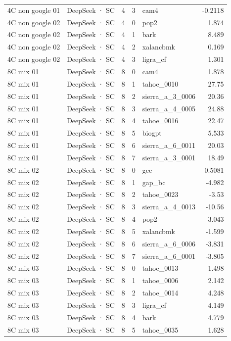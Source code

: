 \begin{tabular}{llrrlr}
4C non google 01 & DeepSeek · SC & 4 & 3 & cam4 & -0.2118 \\
4C non google 02 & DeepSeek · SC & 4 & 0 & pop2 & 1.874 \\
4C non google 02 & DeepSeek · SC & 4 & 1 & bark & 8.489 \\
4C non google 02 & DeepSeek · SC & 4 & 2 & xalancbmk & 0.169 \\
4C non google 02 & DeepSeek · SC & 4 & 3 & ligra\_cf & 1.301 \\
8C mix 01 & DeepSeek · SC & 8 & 0 & cam4 & 1.878 \\
8C mix 01 & DeepSeek · SC & 8 & 1 & tahoe\_0010 & 27.75 \\
8C mix 01 & DeepSeek · SC & 8 & 2 & sierra\_a\_3\_0006 & 20.36 \\
8C mix 01 & DeepSeek · SC & 8 & 3 & sierra\_a\_4\_0005 & 24.88 \\
8C mix 01 & DeepSeek · SC & 8 & 4 & tahoe\_0016 & 22.47 \\
8C mix 01 & DeepSeek · SC & 8 & 5 & biogpt & 5.533 \\
8C mix 01 & DeepSeek · SC & 8 & 6 & sierra\_a\_6\_0011 & 20.03 \\
8C mix 01 & DeepSeek · SC & 8 & 7 & sierra\_a\_3\_0001 & 18.49 \\
8C mix 02 & DeepSeek · SC & 8 & 0 & gcc & 0.5081 \\
8C mix 02 & DeepSeek · SC & 8 & 1 & gap\_bc & -4.982 \\
8C mix 02 & DeepSeek · SC & 8 & 2 & tahoe\_0023 & -3.53 \\
8C mix 02 & DeepSeek · SC & 8 & 3 & sierra\_a\_4\_0013 & -10.56 \\
8C mix 02 & DeepSeek · SC & 8 & 4 & pop2 & 3.043 \\
8C mix 02 & DeepSeek · SC & 8 & 5 & xalancbmk & -1.599 \\
8C mix 02 & DeepSeek · SC & 8 & 6 & sierra\_a\_6\_0006 & -3.831 \\
8C mix 02 & DeepSeek · SC & 8 & 7 & sierra\_a\_6\_0001 & -3.805 \\
8C mix 03 & DeepSeek · SC & 8 & 0 & tahoe\_0013 & 1.498 \\
8C mix 03 & DeepSeek · SC & 8 & 1 & tahoe\_0006 & 2.142 \\
8C mix 03 & DeepSeek · SC & 8 & 2 & tahoe\_0014 & 4.248 \\
8C mix 03 & DeepSeek · SC & 8 & 3 & ligra\_cf & 4.149 \\
8C mix 03 & DeepSeek · SC & 8 & 4 & bark & 4.779 \\
8C mix 03 & DeepSeek · SC & 8 & 5 & tahoe\_0035 & 1.628 \\

\end{tabular}

